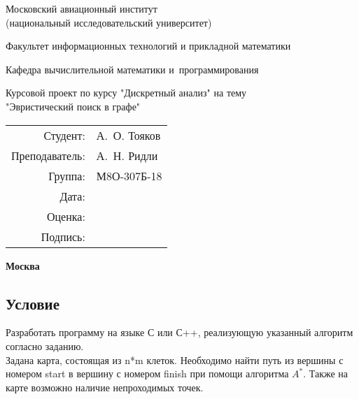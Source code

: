 \documentclass[12pt]{article}
\begin{document}
\thispagestyle{empty}
\begin{center}
	\bfseries

	{\Large Московский авиационный институт\\ (национальный исследовательский университет)

	}

	\vspace{48pt}

	{\large Факультет информационных технологий и прикладной математики
	}

	\vspace{36pt}


	{\large Кафедра вычислительной математики и~программирования

	}


	\vspace{48pt}

	{Курсовой проект по курсу "Дискретный анализ" на тему \\ "Эвристический поиск в графе"}

\end{center}

\vspace{72pt}

\begin{flushright}
	\begin{tabular}{rl}
		Студент:       & А.\, О. Тояков   \\
		Преподаватель: & А.\, Н. Ридли \\
		Группа:        & М8О-307Б-18      \\
		Дата:          &                 \\
		Оценка:        &                  \\
		Подпись:       &                  \\
	\end{tabular}
\end{flushright}

\vfill

\begin{center}
	\bfseries
	Москва\\
	\the\year
\end{center}

\newpage

\subsection*{Условие}

Разработать программу на языке С или С++, реализующую указанный алгоритм согласно заданию.
\\
Задана карта, состоящая из n*m клеток. Необходимо найти путь из вершины с номером start в вершину с номером finish при помощи алгоритма $A^{*}$. Также на карте возможно наличие непроходимых точек.
\end{document}
